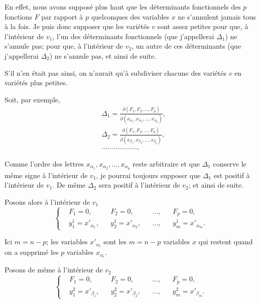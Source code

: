 \documentclass{article}
\begin{document}
En effet, nous avons supposé plus haut que les déterminants fonctionnels des $p$ fonctions $F$ par rapport à $p$ quelconques des variables $x$ ne s'annulent jamais tous à la fois. Je puis donc supposer que les variétés $v$ sont assez petites pour que, à l'intérieur de $v_{1}$, l'un des déterminants fonctionnels (que j'appellerai $\Delta_{1}$) ne s'annule pas; pour que, à l'intérieur de $v_{2}$, un autre de ces déterminants (que j'appellerai $\Delta_{2}$) ne s'annule pas, et ainsi de suite.

S'il n'en était pas ainsi, on n'aurait qu'à subdiviser chacune des variétés $v$ en variétés plus petites.

Soit, par exemple,
\[
\begin{aligned}
&\Delta_{1} = \frac{\partial(F_{1}, F_{2}, \ldots, F_{p})}{\partial(x_{\alpha_{1}}, x_{\alpha_{2}}, \ldots, x_{\alpha_{p}})},\\
&\Delta_{2} = \frac{\partial(F_{1}, F_{2}, \ldots, F_{p})}{\partial(x_{\beta_{1}}, x_{\beta_{2}}, \ldots, x_{\beta_{p}})},\\
&\ldots\ldots\ldots\ldots\ldots\ldots,
\end{aligned}
\]

Comme l'ordre des lettres $x_{\alpha_{1}}, x_{\alpha_{2}}, \ldots, x_{\alpha_{p}}$ reste arbitraire et que $\Delta_{1}$ conserve le même signe à l'intérieur de $v_{1}$, je pourrai toujours supposer que $\Delta_{1}$ est positif à l'intérieur de $v_{1}$. De même $\Delta_{2}$ sera positif à l'intérieur de $v_{2}$; et ainsi de suite.

Posons alors à l'intérieur de $v_{1}$
\[
\left\{
\begin{aligned}
&F_{1} = 0, &&F_{2} = 0, &&\ldots, &&F_{p} = 0,\\
&y^{1}_{1} = x'_{\alpha_{1}}, &&y^{1}_{2} = x'_{\alpha_{2}}, &&\ldots, &&y^{1}_{m} = x'_{\alpha_{m}}.
\end{aligned}
\right.
\tag{13}
\]

Ici $m = n - p$; les variables $x'_{\alpha_{i}}$ sont les $m = n - p$ variables $x$ qui restent quand on a supprimé les $p$ variables $x_{\alpha_{i}}$.

Posons de même à l'intérieur de $v_{2}$
\[
\left\{
\begin{aligned}
&F_{1} = 0, &&F_{2} = 0, &&\ldots, &&F_{p} = 0,\\
&y^{2}_{1} = x'_{\beta_{1}}, &&y^{2}_{2} = x'_{\beta_{2}}, &&\ldots, &&y^{2}_{m} = x'_{\beta_{m}}.
\end{aligned}
\right.
\tag{14}
\]
\end{document}
